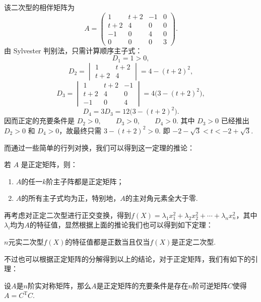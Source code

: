 \begin{solution}
    该二次型的相伴矩阵为
    \[
        A=\begin{pmatrix}
            1 & t+2 & -1 & 0 \\
            t+2 & 4 & 0 & 0 \\
            -1 & 0 & 4 & 0 \\
            0 & 0 & 0 & 3
        \end{pmatrix}.
    \]
    由 Sylvester 判别法，只需计算顺序主子式：
    \[
        D_1=1>0,
    \]
    \[
        D_2=\begin{vmatrix}
            1 & t+2 \\
            t+2 & 4
        \end{vmatrix}
        =4-(t+2)^2,
    \]
    \[
        D_3 = \begin{vmatrix}
                 1 & t+2 & -1 \\
                 t+2 & 4 & 0 \\
                 -1 & 0 & 4
             \end{vmatrix} = 4\bigl(3-(t+2)^2\bigr),
    \]
    \[
        D_4=3D_3=12\bigl(3-(t+2)^2\bigr).
    \]
    因而正定的充要条件是 $D_2>0,\qquad D_3>0,\qquad D_4>0$. 其中 $D_3>0$ 已经推出 $D_2>0$ 和 $D_4>0$，故最终只需 $3-(t+2)^2>0$. 即 $-2-\sqrt{3}<t<-2+\sqrt{3}$.
\end{solution}

而通过一些简单的行列对换，我们可以得到这一定理的推论：
\begin{corollary}{}{}
    若 $A$ 是正定矩阵，则：
    \begin{enumerate}
        \item $A$的任一$k$阶主子阵都是正定矩阵；
        \item $A$的所有主子式均为正，特别地，$A$的主对角元素全大于零.
    \end{enumerate}
\end{corollary}

再考虑对正定二次型进行正交变换，得到$f(X) = \lambda_1 x_1^2 + \lambda_2 x_2^2 + \cdots + \lambda_n x_n^2$，其中$\lambda_i$均为$A$的特征值，显然根据上面的推论我们也可以得到如下定理：

\begin{theorem}{}{}
    $n$元实二次型$f(X)$的特征值都是正数当且仅当$f(X)$是正定二次型.
\end{theorem}

不过也可以根据正定矩阵的分解得到以上的结论，对于正定矩阵，我们有如下的引理：

\begin{lemma}{}{}
    设$A$是$n$阶实对称矩阵，那么$A$是正定矩阵的充要条件是存在$n$阶可逆矩阵$C$使得$A=C^\mathrm{T}C$.
\end{lemma}

